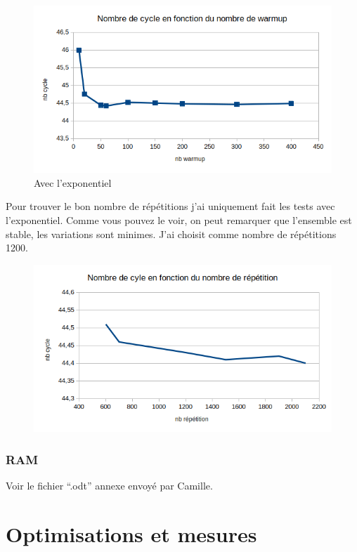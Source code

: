 \documentclass[12pt,a4paper]{article}
\begin{document}
\begin{figure}[!h]
    \includegraphics[scale=0.8]{figures/L2/L2warmup2.png}
    \caption{Avec l'exponentiel}
\end{figure}

Pour trouver le bon nombre de répétitions j'ai uniquement fait les tests avec
l'exponentiel. Comme vous pouvez le voir, on peut remarquer que l'ensemble est
stable, les variations sont minimes. J'ai choisit comme nombre de répétitions
1200.
\begin{figure}[!h]
    \includegraphics[scale=0.8]{figures/L2/L2repet.png}
    \caption{ }
\end{figure}

\subsubsection{RAM}

Voir le fichier \enquote{.odt} annexe envoyé par Camille.

\section{Optimisations et mesures}
\end{document}
